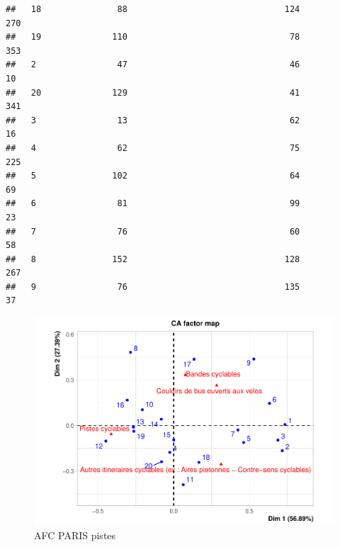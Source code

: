 \documentclass[french,]{compterendu}
\theoremstyle{urcastyle}
\theoremstyle{remark}
\begin{document}
\begin{verbatim}
##   18               88                               124              270
##   19              110                                78              353
##   2                47                                46               10
##   20              129                                41              341
##   3                13                                62               16
##   4                62                                75              225
##   5               102                                64               69
##   6                81                                99               23
##   7                76                                60               58
##   8               152                               128              267
##   9                76                               135               37
\end{verbatim}

\begin{figure}[H]

{\centering \includegraphics[width=0.9\linewidth]{Rapport_ADD_LEO-GABET_files/figure-latex/Afc5PARISvelo-1} 

}

\caption{AFC PARIS pistes}\label{fig:Afc5PARISvelo}
\end{figure}
\end{document}
